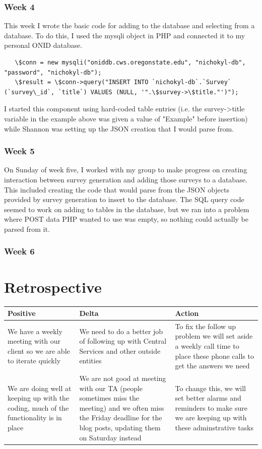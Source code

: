 \documentclass[letterpaper,10pt,serif, draftclsnofoot,onecolumn, compsoc, titlepage]{IEEEtran}
\begin{document}
\subsubsection{Week 4}
This week I wrote the basic code for adding to the database and selecting from a database.
To do this, I used the mysqli object in PHP and connected it to my personal ONID database.
\begin{lstlisting}
   \$conn = new mysqli("oniddb.cws.oregonstate.edu", "nichokyl-db", "password", "nichokyl-db");
   \$result = \$conn->query("INSERT INTO `nichokyl-db`.`Survey` (`survey\_id`, `title`) VALUES (NULL, '".\$survey->\$title."')");
\end{lstlisting}
I started this component using hard-coded table entries (i.e. the survey->title variable in the example above was given a value of "Example" before insertion) while Shannon was setting up the JSON creation that I would parse from.
\subsubsection{Week 5}
On Sunday of week five, I worked with my group to make progress on creating interaction between survey generation and adding those surveys to a database.
This included creating the code that would parse from the JSON objects provided by survey generation to insert to the database.
The SQL query code seemed to work on adding to tables in the database, but we ran into a problem where POST data PHP wanted to use was empty, so nothing could actually be parsed from it.
\subsubsection{Week 6}


\section{Retrospective}
\begin{center}
    \begin{tabular}{ | p{5cm} | p{5cm} | p{5cm} |}
    \hline
     Positive & Delta & Action \\ \hline
	We have a weekly meeting with our client so we are able to iterate quickly & We need to do a better job of following up with Central Services and other outside entities & To fix the follow up problem we will set aside a weekly call time to place these phone calls to get the answers we need \\ \hline
  	We are doing well at keeping up with the coding, much of the functionality is in place & We are not good at meeting with our TA (people sometimes miss the meeting) and we often miss the Friday deadline for the blog posts, updating them on Saturday instead & To change this, we will set better alarms and reminders to make sure we are keeping up with these adminstrative tasks \\ \hline
    \end{tabular}
\end{center}
\end{document}
